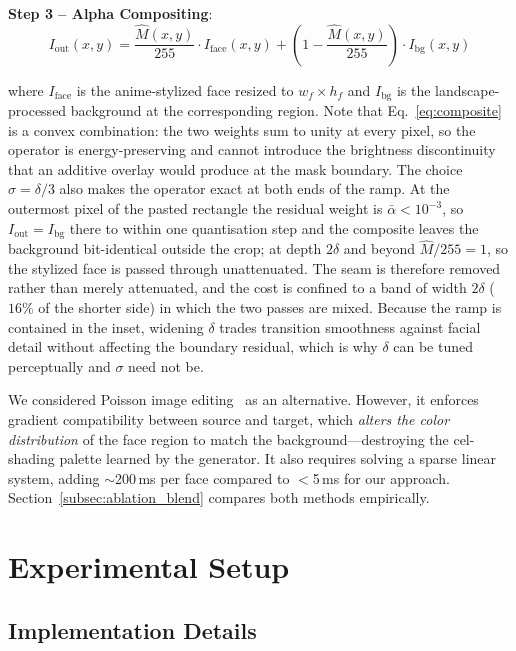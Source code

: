 \documentclass[journal]{IEEEtran}
\begin{document}
\textbf{Step 3 -- Alpha Compositing}:
\begin{equation}
I_{\text{out}}(x,y) = \frac{\hat{M}(x,y)}{255} \cdot I_{\text{face}}(x,y) + \left(1 - \frac{\hat{M}(x,y)}{255}\right) \cdot I_{\text{bg}}(x,y)
\label{eq:composite}
\end{equation}

where $I_{\text{face}}$ is the anime-stylized face resized to $w_f \times h_f$ and $I_{\text{bg}}$ is the landscape-processed background at the corresponding region. Note that Eq.~\eqref{eq:composite} is a convex combination: the two weights sum to unity at every pixel, so the operator is energy-preserving and cannot introduce the brightness discontinuity that an additive overlay would produce at the mask boundary. The choice $\sigma = \delta/3$ also makes the operator exact at both ends of the ramp. At the outermost pixel of the pasted rectangle the residual weight is $\bar{\alpha} < 10^{-3}$, so $I_{\text{out}} = I_{\text{bg}}$ there to within one quantisation step and the composite leaves the background bit-identical outside the crop; at depth $2\delta$ and beyond $\hat{M}/255 = 1$, so the stylized face is passed through unattenuated. The seam is therefore removed rather than merely attenuated, and the cost is confined to a band of width $2\delta$ ($16\%$ of the shorter side) in which the two passes are mixed. Because the ramp is contained in the inset, widening $\delta$ trades transition smoothness against facial detail without affecting the boundary residual, which is why $\delta$ can be tuned perceptually and $\sigma$ need not be.

We considered Poisson image editing~\cite{Perez2003Poisson} as an alternative. However, it enforces gradient compatibility between source and target, which \textit{alters the color distribution} of the face region to match the background---destroying the cel-shading palette learned by the generator. It also requires solving a sparse linear system, adding $\sim$200\,ms per face compared to $<$5\,ms for our approach. Section~\ref{subsec:ablation_blend} compares both methods empirically.


\section{Experimental Setup}
\label{sec:setup}

\subsection{Implementation Details}
\end{document}
